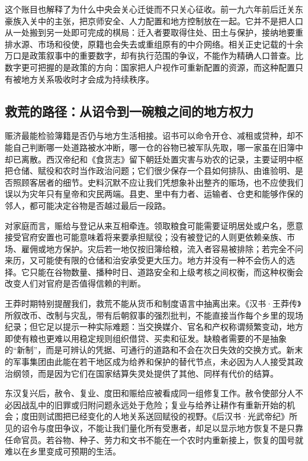 这个账目也解释了为什么中央会关心迁徙而不只关心征收。前一九六年前后迁关东豪族入关中的主张，把京师安全、人力配置和地方控制放在一起。它并不是把人口从一处搬到另一处即可完成的棋局：迁入者要取得住处、田土与保护，接纳地要重排水源、市场和役使，原籍也会失去或重组原有的中介网络。相关正史记载的十余万口是政策叙事中的重要数字，却有执行范围的争议，不能作为精确人口普查。比数字更可把握的是政策的方向：国家把人户视作可重新配置的资源，而这种配置只有被地方关系吸收时才会成为持续秩序。

\subsection{救荒的路径：从诏令到一碗粮之间的地方权力}

赈济最能检验簿籍是否仍与地方生活相接。诏书可以命令开仓、减租或贷种，却不能自己判断哪一处道路被水冲断，哪一仓的谷物已被军队先取，哪一家虽在旧簿中却已离散。西汉帝纪和《食货志》留下朝廷处置灾害与劝农的记录，主要证明中枢把仓储、赋役和农时当作政治问题；它们很少保存一个县如何排队、由谁验明、是否照顾客居者的细节。史料沉默不应让我们凭想象补出整齐的赈场，也不应使我们误以为灾年只有皇帝和灾民两端。县吏、里中有力者、运输者、仓吏和能够作保的邻人，都可能决定谷物是否越过最后一段路。

对家庭而言，赈给与登记从来互相牵连。领取粮食可能需要证明居处或户名，愿意接受官府安置也可能意味着将来要承担赋役；没有被登记的人则更依赖亲族、市场、雇佣或地方保护。灾后若一地仅按旧簿给粮，流入者容易被排除；若完全不问来历，又可能使有限的仓储和治安承受更大压力。地方并没有一种不会伤人的选择。它只能在谷物数量、播种时日、道路安全和上级考核之间权衡，而这种权衡会改变人们对官府是否值得信赖的判断。

王莽时期特别提醒我们，救荒不能从货币和制度语言中抽离出来。《汉书·王莽传》所叙改币、改制与灾乱，带有后朝叙事的强烈批判，不能直接当作每个乡里的现场纪录；但它足以提示一种实际难题：当交换媒介、官名和产权称谓频繁变动，地方即使有粮也更难以用稳定规则组织借贷、买卖和征发。缺粮者需要的不是抽象的“新制”，而是可辨认的凭据、可通行的道路和不会在次日失效的交换方式。新末的军事集团由此能在若干地区成为给养和保护的替代节点，未必因为人人接受其政治纲领，而是因为它们在国家结算失灵处提供了其他、同样有代价的结算。

东汉复兴后，赦令、复业、度田和赈给应被看成同一组修复工作。赦令使部分人不必因战乱中的旧罪或归附问题永远处于危险；复业与给养让耕作有重新开始的机会；度田则试图把已经变化的人地关系送回赋役的视野。《后汉书·光武帝纪》所见的诏令与度田争议，不能让我们量化所有受惠者，却足以显示地方恢复不是只靠任命官员。若谷物、种子、劳力和文书不能在一个农时内重新接上，恢复的国号就难以在乡里变成可预期的生活。

